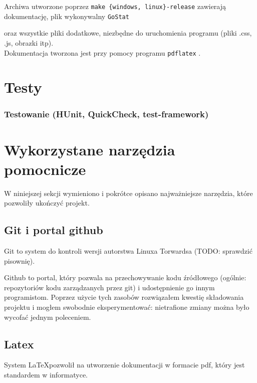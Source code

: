\documentclass[10pt,leqno]{article}
\newcommand{\cmd}[1]{
  \texttt{#1}
}
\begin{document}
\noindent Archiwa utworzone poprzez \cmd{make \{windows, linux\}-release} zawierają dokumentację, plik wykonywalny \cmd{GoStat}
oraz wszystkie pliki dodatkowe, niezbędne do uruchomienia programu (pliki .css, .js, obrazki itp). \\

\noindent Dokumentacja tworzona jest przy pomocy programu \cmd{pdflatex}.

\section{Testy}

\subsubsection{Testowanie (HUnit, QuickCheck, test-framework)}

\section{Wykorzystane narzędzia pomocnicze}

W niniejszej sekcji wymieniono i pokrótce opisano najważniejsze narzędzia, które pozwoliły ukończyć projekt.

\subsection{Git i portal github}
Git \cite{git} to system do kontroli wersji autorstwa Linuxa Torwardsa (TODO: sprawdzić pisownię). 

Github \cite{github} to portal, który pozwala
na przechowywanie kodu źródłowego (ogólnie: repozytoriów kodu zarządzanych przez git) i udostępnienie go innym programistom.
Poprzez użycie tych zasobów rozwiązałem kwestię składowania projektu i mogłem swobodnie eksperymentować: nietrafione zmiany
można było wycofać jednym poleceniem.

\subsection{Latex}
System \LaTeX pozwolił na utworzenie dokumentacji w formacie pdf, który jest standardem w informatyce.
\end{document}
